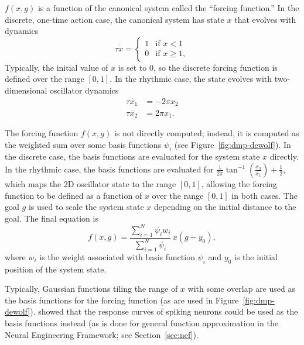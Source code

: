 $f(x, g)$ is a function
of the canonical system
called the ``forcing function.''
In the discrete, one-time action case,
the canonical system
has state $x$ that evolves
with dynamics
\begin{equation}
  \label{dmp-discrete}
  \tau\dot{x} =
  \begin{cases}
    1 &\text{if } x < 1 \\
    0 &\text{if } x \ge 1,
  \end{cases}
\end{equation}
Typically, the initial value of $x$
is set to 0,
so the discrete forcing function
is defined over the range $[0, 1]$.
In the rhythmic case,
the state evolves with
two-dimensional oscillator dynamics
\begin{align}
  \tau \dot{x_1} &= -2 \pi x_2 \nonumber \\
  \tau \dot{x_2} &= 2 \pi x_1.
  \label{dmp-rhythmic}
\end{align}


The forcing function $f(x, g)$ is
not directly computed;
instead, it is computed as the weighted sum
over some basis functions $\psi_i$
(see Figure~\ref{fig:dmp-dewolf}).
In the discrete case,
the basis functions are evaluated
for the system state $x$ directly.
In the rhythmic case,
the basis functions are evaluated for
$\textstyle \frac{1}{2\pi}\tan^{-1}\left(\frac{x_2}{x_1}\right)+ \frac{1}{2}$,
which maps the 2D oscillator state
to the range $[0, 1]$,
allowing the forcing function to be defined
as a function of $x$ over the range $[0, 1]$
in both cases.
The goal $g$ is used
to scale the system state $x$ depending on
the initial distance to the goal.
The final equation is
\begin{equation}
  \label{dmp-forcing-func}
  f(x, g) = \frac{\sum_{i=1}^N \psi_i w_i}{\sum_{i=1}^N \psi_i} \, x(g - y_0),
\end{equation}
where $w_i$ is the weight associated with
basis function $\psi_i$ and $y_0$
is the initial position of
the system state.

Typically, Gaussian functions
tiling the range of $x$ with some overlap
are used as the basis functions
for the forcing function
(as are used in Figure~\ref{fig:dmp-dewolf}).
\citet{dewolf2015} showed that
the response curves of spiking neurons
could be used as the
basis functions instead
(as is done for general function approximation
in the Neural Engineering Framework;
see Section~\ref{sec:nef}).

